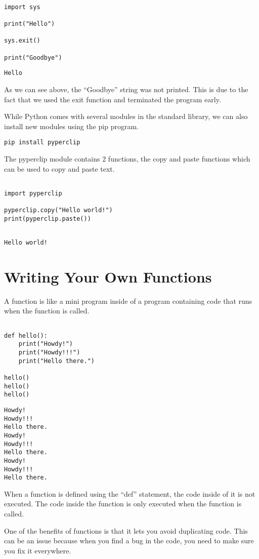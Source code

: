 \documentclass[11pt]{article}
\begin{document}
\begin{verbatim}

import sys

print("Hello")

sys.exit()

print("Goodbye")

\end{verbatim}

\begin{verbatim}
Hello
\end{verbatim}


As we can see above, the ``Goodbye'' string was not printed. This is due to the fact that we used the exit function and terminated the program early.


While Python comes with several modules in the standard library, we can also install new modules using the pip program.

\begin{verbatim}
pip install pyperclip
\end{verbatim}


The pyperclip module contains 2 functions, the copy and paste functions which can be used to copy and paste text.

\begin{verbatim}

import pyperclip

pyperclip.copy("Hello world!")
print(pyperclip.paste())


\end{verbatim}

\begin{verbatim}
Hello world!
\end{verbatim}

\section{Writing Your Own Functions}
\label{sec:orgecfa281}

A function is like a mini program inside of a program containing code that runs when the function is called.


\begin{verbatim}

def hello():
    print("Howdy!")
    print("Howdy!!!")
    print("Hello there.")

hello()
hello()
hello()

\end{verbatim}

\begin{verbatim}
Howdy!
Howdy!!!
Hello there.
Howdy!
Howdy!!!
Hello there.
Howdy!
Howdy!!!
Hello there.
\end{verbatim}


When a function is defined using the ``def'' statement, the code inside of it is not executed. The code inside the function is only executed when the function is called.

One of the benefits of functions is that it lets you avoid duplicating code. This can be an issue because when you find a bug in the code, you need to make sure you fix it everywhere.
\end{document}
